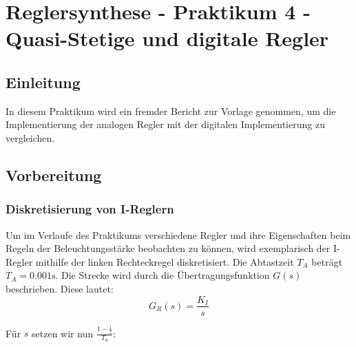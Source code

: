 \documentclass{report}
\begin{document}

\newpage

\tableofcontents

\listoffigures

\newpage

\listoftables


\chapter{Reglersynthese - Praktikum 4 - Quasi-Stetige und digitale Regler}
\section{Einleitung}

In diesem Praktikum wird ein fremder Bericht zur Vorlage genommen, um die Implementierung der analogen Regler mit der digitalen Implementierung zu vergleichen.

\section{Vorbereitung}
\label{sec:vorbereitung}

\subsection{Diskretisierung von I-Reglern}
\label{sec:diskr-von-i}


Um im Verlaufe des Praktikums verschiedene Regler und ihre Eigenschaften beim Regeln der Beleuchtungsstärke beobachten zu können, wird exemplarisch der I-Regler mithilfe der linken Rechteckregel diskretisiert. Die Abtastzeit $T_A$ beträgt $T_A = 0.001\mathrm{s}$. Die Strecke wird durch die Übertragungsfunktion $G(s)$ beschrieben. Diese lautet:
$$G_{R}(s) = \frac{K_{I}}{s}$$

Für $s$ setzen wir nun $\frac{1-\frac{1}{z}}{T_{a}}$:
\end{document}
